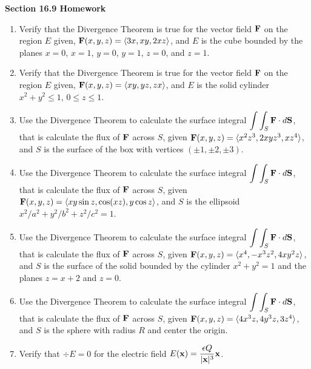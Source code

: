\documentclass[11pt]{article}
\newcommand{\bx}{{\bf x }}
\newcommand{\bF}{{\bf F }}
\newcommand{\bS}{{\bf S }}
\newcommand{\LL}{\langle}
\newcommand{\RR}{\rangle}
\begin{document}

\thispagestyle{plain} %


\vspace{0.3cm} %

\begin{center}
{\bf Section 16.9 Homework}\\
\end{center}

\vspace{0.1cm}

\begin{enumerate}

\item Verify that the Divergence Theorem is true for the vector field $\bF$ on the region $E$ given, $\bF(x,y,z) = \LL 3x, xy, 2xz\RR$, and $E$ is the cube bounded by the planes $x=0$, $x=1$, $y=0$, $y=1$, $z=0$, and $z=1$.

\item[3.] Verify that the Divergence Theorem is true for the vector field $\bF$ on the region $E$ given, $\bF(x,y,z) = \LL xy, yz, zx\RR$, and $E$ is the solid cylinder $x^2 + y^2 \leq 1$, $0 \leq z\leq 1$.

\item[6.] Use the Divergence Theorem to calculate the surface integral $\displaystyle \int \int_S \bF \cdot d\bS$, that is calculate the flux of $\bF$ across $S$, given $\bF(x,y,z) = \LL x^2z^3,2xyz^3, xz^4 \RR $, and $S$ is the surface of the box with vertices $(\pm 1, \pm 2, \pm 3)$.

\item[9.] Use the Divergence Theorem to calculate the surface integral $\displaystyle \int \int_S \bF \cdot d\bS$, that is calculate the flux of $\bF$ across $S$, given $\bF(x,y,z) = \LL xy\sin z, \cos(xz), y \cos z \RR$, and $S$ is the ellipsoid $x^2/a^2 + y^2/b^2 + z^2/c^2 = 1$.

\item[12.] Use the Divergence Theorem to calculate the surface integral $\displaystyle \int \int_S \bF \cdot d\bS$, that is calculate the flux of $\bF$ across $S$, given $\bF(x,y,z) = \LL x^4, -x^3z^2, 4xy^2z\RR$, and $S$ is the surface of the solid bounded by the cylinder $x^2+y^2 = 1$ and the planes $z=x+2$ and $z=0$.

\item[13.] Use the Divergence Theorem to calculate the surface integral $\displaystyle \int \int_S \bF \cdot d\bS$, that is calculate the flux of $\bF$ across $S$, given $\bF(x,y,z) = \LL 4x^3z, 4y^3z, 3z^4 \RR$, and $S$ is the sphere with radius $R$ and center the origin.

\item[23.] Verify that $\div E = 0$ for the electric field $E(\bx) = \displaystyle \frac{\epsilon Q}{|\bx|^3}\bx$.



\end{enumerate}
\end{document}
